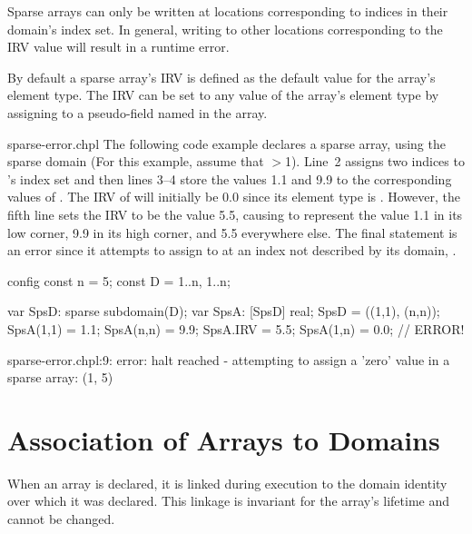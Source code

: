 Sparse arrays can only be written at locations corresponding to
indices in their domain's index set.  In general, writing to other
locations corresponding to the IRV value will result in a runtime
error.

By default a sparse array's IRV is defined as the default value for
the array's element type.  The IRV can be set to any value of the
array's element type by assigning to a pseudo-field named 
in the array.

\begin{chapelexample}{sparse-error.chpl}
The following code example declares a sparse array,  using
the sparse domain  (For this example, assume that
$>$1).  Line~2 assigns two indices to 's index set
and then lines 3--4 store the values 1.1 and 9.9 to the corresponding
values of .  The IRV of  will initially be 0.0
since its element type is .  However, the fifth line sets
the IRV to be the value 5.5, causing  to represent the
value 1.1 in its low corner, 9.9 in its high corner, and 5.5
everywhere else.  The final statement is an error since it attempts to
assign to  at an index not described by its domain,
.

\begin{chapelpre}
config const n = 5;
const D = {1..n, 1..n};
\end{chapelpre}
\begin{chapel}
var SpsD: sparse subdomain(D);
var SpsA: [SpsD] real;
SpsD = ((1,1), (n,n));
SpsA(1,1) = 1.1;
SpsA(n,n) = 9.9;
SpsA.IRV = 5.5;
SpsA(1,n) = 0.0;  // ERROR!
\end{chapel}
\begin{chapeloutput}
sparse-error.chpl:9: error: halt reached - attempting to assign a 'zero' value in a sparse array: (1, 5)
\end{chapeloutput}
\end{chapelexample}



\section{Association of Arrays to Domains}
\label{Association_of_Arrays_to_Domains}

%
%

When an array is declared, it is linked during execution to the domain
identity over which it was declared.  This linkage is invariant for
the array's lifetime and cannot be changed.


